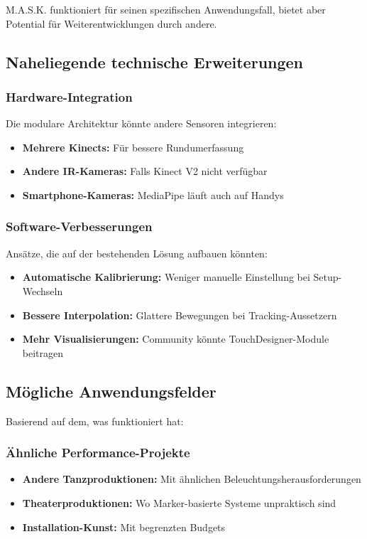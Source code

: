 
M.A.S.K. funktioniert für seinen spezifischen Anwendungsfall, bietet aber Potential für Weiterentwicklungen durch andere.

\subsection{Naheliegende technische Erweiterungen}

\subsubsection{Hardware-Integration}
Die modulare Architektur könnte andere Sensoren integrieren:
\begin{itemize}
    \item \textbf{Mehrere Kinects:} Für bessere Rundumerfassung
    \item \textbf{Andere IR-Kameras:} Falls Kinect V2 nicht verfügbar
    \item \textbf{Smartphone-Kameras:} MediaPipe läuft auch auf Handys
\end{itemize}

\subsubsection{Software-Verbesserungen}
Ansätze, die auf der bestehenden Lösung aufbauen könnten:
\begin{itemize}
    \item \textbf{Automatische Kalibrierung:} Weniger manuelle Einstellung bei Setup-Wechseln
    \item \textbf{Bessere Interpolation:} Glattere Bewegungen bei Tracking-Aussetzern
    \item \textbf{Mehr Visualisierungen:} Community könnte TouchDesigner-Module beitragen
\end{itemize}

\subsection{Mögliche Anwendungsfelder}

Basierend auf dem, was funktioniert hat:

\subsubsection{Ähnliche Performance-Projekte}
\begin{itemize}
    \item \textbf{Andere Tanzproduktionen:} Mit ähnlichen Beleuchtungsherausforderungen
    \item \textbf{Theaterproduktionen:} Wo Marker-basierte Systeme unpraktisch sind
    \item \textbf{Installation-Kunst:} Mit begrenzten Budgets
\end{itemize}

